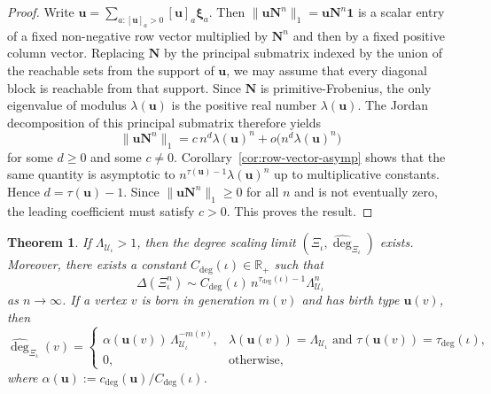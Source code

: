 \documentclass[12pt]{iopart}
\newtheorem{theorem}{Theorem}[section]
\newcommand*{\bbbxi}{\boldsymbol{\xi}}
\begin{document}
\begin{proof}
Write $\mathbf u=\sum_{a:[\mathbf u]_a>0}[\mathbf u]_a\bbbxi_a$.
Then $\|\mathbf u\mathbf N^n\|_1=\mathbf u\mathbf N^n\mathbf 1$ is a scalar entry of a fixed non-negative row vector multiplied by $\mathbf N^n$ and then by a fixed positive column vector.
Replacing $\mathbf N$ by the principal submatrix indexed by the union of the reachable sets from the support of $\mathbf u$, we may assume that every diagonal block is reachable from that support.
Since $\mathbf N$ is primitive-Frobenius, the only eigenvalue of modulus $\lambda(\mathbf u)$ is the positive real number $\lambda(\mathbf u)$.
The Jordan decomposition of this principal submatrix therefore yields
\[
\|\mathbf u\mathbf N^n\|_1
=
c\,n^d\lambda(\mathbf u)^n
+
o\big(n^d\lambda(\mathbf u)^n\big)
\]
for some $d\ge 0$ and some $c\ne 0$.
Corollary~\ref{cor:row-vector-asymp} shows that the same quantity is asymptotic to
$n^{\tau(\mathbf u)-1}\lambda(\mathbf u)^n$ up to multiplicative constants.
Hence $d=\tau(\mathbf u)-1$.
Since $\|\mathbf u\mathbf N^n\|_1\ge 0$ for all $n$ and is not eventually zero, the leading coefficient must satisfy $c>0$.
This proves the result.
\end{proof}

\begin{theorem}\label{thm:degree-scaling-limit}
If $\Lambda_{\mathcal U_\iota}>1$, then the degree scaling limit $(\Xi_\iota,\hat{\deg}_{\Xi_\iota})$ exists.
Moreover, there exists a constant $C_{\deg}(\iota)\in\mathbb R_+$ such that
\[
\Delta(\Xi_\iota^n)
\sim
C_{\deg}(\iota)\,
n^{\tau_{\deg}(\iota)-1}\Lambda_{\mathcal U_\iota}^n
\]
as $n\to\infty$.
If a vertex $v$ is born in generation $m(v)$ and has birth type $\mathbf u(v)$, then
\[
\hat{\deg}_{\Xi_\iota}(v)
=
\begin{cases}
\alpha(\mathbf u(v))\,\Lambda_{\mathcal U_\iota}^{-m(v)},
&
\lambda(\mathbf u(v))=\Lambda_{\mathcal U_\iota}
\text{ and }
\tau(\mathbf u(v))=\tau_{\deg}(\iota),
\\[1ex]
0,
&
\text{otherwise},
\end{cases}
\]
where $\alpha(\mathbf u):=c_{\deg}(\mathbf u)/C_{\deg}(\iota)$.
\end{theorem}
\end{document}
